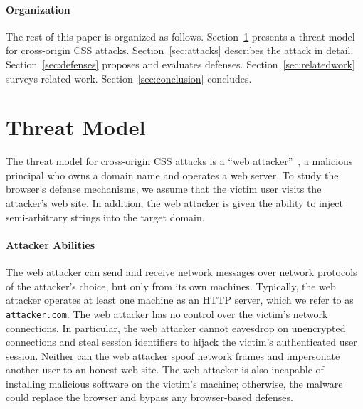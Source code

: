 \documentclass{acm_proc_article-sp}
\begin{document}
\paragraph{Organization}
The rest of this paper is organized as follows. Section~\ref{sec:threatmodel} presents a threat model for cross-origin CSS attacks.
Section~\ref{sec:attacks} describes the attack in detail. Section~\ref{sec:defenses} proposes and evaluates defenses.
Section~\ref{sec:relatedwork} surveys related work.
Section~\ref{sec:conclusion} concludes.

% 

% 

\section{Threat Model} \label{sec:threatmodel}

The threat model for cross-origin CSS attacks is a ``web
attacker''~\cite{jackson09thesis}, a malicious principal who owns a domain
name and operates a web server. To study the browser's defense mechanisms, we
assume that the victim user visits the attacker's web site. In addition, the
web attacker is given the ability to inject semi-arbitrary strings into the
target domain.
% 

\paragraph{Attacker Abilities}
The web attacker can send and receive network messages over network protocols of the attacker's choice, but only from its own machines. Typically, the web attacker operates at least one machine as an HTTP server, which we refer to as \texttt{attacker.com}. The web attacker has no control over the victim's network connections. In particular, the web attacker cannot eavesdrop on unencrypted connections and steal session identifiers to hijack the victim's authenticated user session. Neither can the web attacker spoof network frames and impersonate another user to an honest web site.
The web attacker is also incapable of installing malicious software on the victim's machine; otherwise, the malware could replace the browser and bypass any browser-based defenses.
\end{document}
